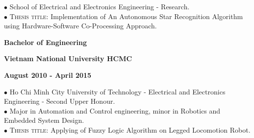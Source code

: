 \documentclass[10pt]{article}
\begin{document}
        $\bullet$ {School of Electrical and Electronics Engineering - Research.} \\
        $\bullet$ \textsc{Thesis title}: Implementation of An Autonomous Star Recognition Algorithm using Hardware-Software Co-Processing Approach.


        \begin{multicols}{3}
            \begin{flushleft}
                \textbf{Bachelor of Engineering}
            \end{flushleft}

            \columnbreak

            \begin{center}
                \textbf{Vietnam National University HCMC}
            \end{center}

            \columnbreak

            \begin{flushright}
                \textbf{August 2010 - April 2015}
            \end{flushright}
        \end{multicols}

        \vspace{-5mm}

        $\bullet$ {Ho Chi Minh City University of Technology - Electrical and Electronics Engineering - Second Upper Honour.} \\
        $\bullet$ {Major in Automation and Control engineering, minor in Robotics and Embedded System Design.} \\
        $\bullet$ \textsc{Thesis title}: Applying of Fuzzy Logic Algorithm on Legged Locomotion Robot.


    \newpage
    \vspace{2mm}
\end{document}

